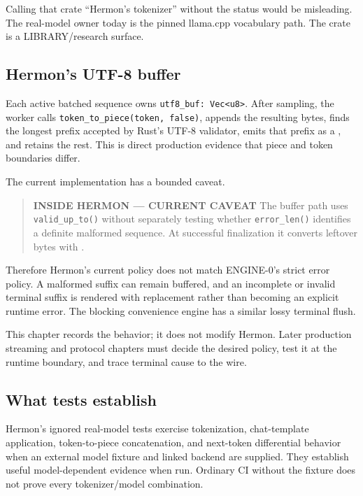 Calling that crate ``Hermon's tokenizer'' without the status would be
misleading. The real-model owner today is the pinned llama.cpp
vocabulary path. The crate is a LIBRARY/research surface.

\subsection{Hermon's UTF-8 buffer}\label{hermons-utf-8-buffer}

Each active batched sequence owns
\texttt{utf8\_buf:\ Vec\textless{}u8\textgreater{}}. After sampling, the
worker calls \texttt{token\_to\_piece(token,\ false)}, appends the
resulting bytes, finds the longest prefix accepted by Rust's UTF-8
validator, emits that prefix as a
\texttt{}, and retains the rest.
This is direct production evidence that piece and token boundaries
differ.

The current implementation has a bounded caveat.

\begin{quote}
\textbf{INSIDE HERMON --- CURRENT CAVEAT} The buffer path uses
\texttt{valid\_up\_to()} without separately testing whether
\texttt{error\_len()} identifies a definite malformed sequence. At
successful finalization it converts leftover bytes with
\texttt{}.
\end{quote}

Therefore Hermon's current policy does not match ENGINE-0's strict error
policy. A malformed suffix can remain buffered, and an incomplete or
invalid terminal suffix is rendered with replacement rather than
becoming an explicit runtime error. The blocking convenience engine has
a similar lossy terminal flush.

This chapter records the behavior; it does not modify Hermon. Later
production streaming and protocol chapters must decide the desired
policy, test it at the runtime boundary, and trace terminal cause to the
wire.

\subsection{What tests establish}\label{what-tests-establish}

Hermon's ignored real-model tests exercise tokenization, chat-template
application, token-to-piece concatenation, and next-token differential
behavior when an external model fixture and linked backend are supplied.
They establish useful model-dependent evidence when run. Ordinary CI
without the fixture does not prove every tokenizer/model combination.

